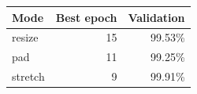 \begin{center}\begin{tabular}{lrr}
\toprule
Mode & Best epoch & Validation \\\midrule
resize & 15 & 99.53\% \\
pad & 11 & 99.25\% \\
stretch & 9 & 99.91\% \\
\bottomrule\end{tabular}\end{center}
